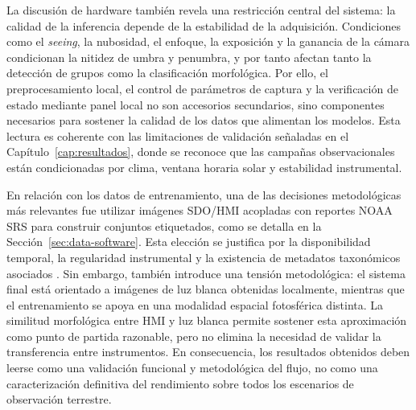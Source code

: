 La discusión de hardware también revela una restricción central del sistema: la
calidad de la inferencia depende de la estabilidad de la adquisición. Condiciones
como el \textit{seeing}, la nubosidad, el enfoque, la exposición y la ganancia de
la cámara condicionan la nitidez de umbra y penumbra, y por tanto afectan tanto
la detección de grupos como la clasificación morfológica. Por ello, el
preprocesamiento local, el control de parámetros de captura y la verificación de
estado mediante panel local no son accesorios secundarios, sino componentes
necesarios para sostener la calidad de los datos que alimentan los modelos. Esta
lectura es coherente con las limitaciones de validación señaladas en el
Capítulo~\ref{cap:resultados}, donde se reconoce que las campañas observacionales
están condicionadas por clima, ventana horaria solar y estabilidad instrumental.

En relación con los datos de entrenamiento, una de las decisiones metodológicas
más relevantes fue utilizar imágenes SDO/HMI acopladas con reportes NOAA SRS para
construir conjuntos etiquetados, como se detalla en la
Sección~\ref{sec:data-software}. Esta elección se justifica por la disponibilidad
temporal, la regularidad instrumental y la existencia de metadatos taxonómicos
asociados \citep{scherrer2012hmi,noaaSRS}. Sin embargo, también introduce
una tensión metodológica: el sistema
final está orientado a imágenes de luz blanca obtenidas localmente, mientras que
el entrenamiento se apoya en una modalidad espacial fotosférica distinta. La
similitud morfológica entre HMI y luz blanca permite sostener esta aproximación
como punto de partida razonable, pero no elimina la necesidad de validar la
transferencia entre instrumentos. En consecuencia, los resultados obtenidos deben
leerse como una validación funcional y metodológica del flujo, no como una
caracterización definitiva del rendimiento sobre todos los escenarios de
observación terrestre.

